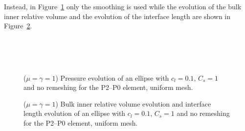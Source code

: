 \documentclass[a4paper,12pt,onecolumn]{article}
\begin{document}
Instead, in Figure~\ref{fig:ellipse_smooth} only the smoothing is used while
the evolution of the bulk inner relative volume and the evolution of the
interface length are shown in Figure~\ref{fig:ellipse_smooth_volumes}.
\begin{figure}[htbp]
  \centering
  \\
  \quad
  \\
  \quad
  \\
  \caption{($\mu=\gamma=1$) Pressure evolution of an ellipse with $c_l=0.1$,
$C_s=1$ and no remeshing for the P2--P0 element, uniform mesh.}
  \label{fig:ellipse_smooth}
\end{figure}

\begin{figure}[htbp]
  \centering
  \caption{($\mu=\gamma=1$) Bulk inner relative volume evolution and interface
length evolution of an ellipse with $c_l=0.1$, $C_s=1$ and no remeshing for the
P2--P0 element, uniform mesh.}
  \label{fig:ellipse_smooth_volumes}
\end{figure}
\end{document}
